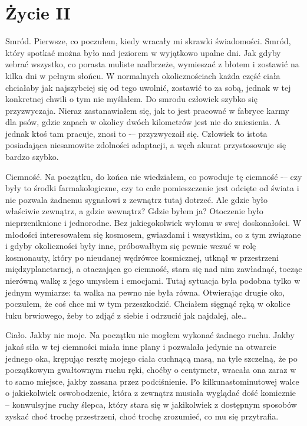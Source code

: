 \chapter{Życie II}

Smród. Pierwsze, co poczułem, kiedy wracały mi skrawki świadomości. Smród, który spotkać można było nad jeziorem w wyjątkowo upalne dni. Jak gdyby zebrać wszystko, co porasta muliste nadbrzeże, wymieszać z błotem i zostawić na kilka dni w pełnym słońcu. W normalnych okolicznościach każda część ciała chciałaby jak najszybciej się od tego uwolnić, zostawić to za sobą, jednak w tej konkretnej chwili o tym nie myślałem. Do smrodu człowiek szybko się przyzwyczaja. Nieraz zastanawiałem się, jak to jest pracować w fabryce karmy dla psów, gdzie zapach w okolicy dwóch kilometrów jest nie do zniesienia. A jednak ktoś tam pracuje, znosi to -– przyzwyczaił się. Człowiek to istota posiadająca niesamowite zdolności adaptacji, a węch akurat przystosowuje się bardzo szybko. 

Ciemność. Na początku, do końca nie wiedziałem, co powoduje tę ciemność -– czy były to środki farmakologiczne, czy to całe pomieszczenie jest odcięte od świata i nie pozwala żadnemu sygnałowi z zewnątrz tutaj dotrzeć. Ale gdzie było właściwie zewnątrz, a gdzie wewnątrz? Gdzie byłem ja? Otoczenie było nieprzeniknione i jednorodne. Bez jakiegokolwiek wyłomu w swej doskonałości. W młodości interesowałem się kosmosem, gwiazdami i wszystkim, co z tym związane i gdyby okoliczności były inne, próbowałbym się pewnie wczuć w rolę kosmonauty, który po nieudanej wędrówce kosmicznej, utknął w przestrzeni międzyplanetarnej, a otaczająca go ciemność, stara się nad nim zawładnąć, tocząc nierówną walkę z jego umysłem i emocjami. Tutaj sytuacja była podobna tylko w jednym wymiarze: ta walka na pewno nie była równa. Otwierając drugie oko, poczułem, że coś chce mi w tym przeszkodzić. Chciałem sięgnąć ręką w okolice łuku brwiowego, żeby to zdjąć z siebie i odrzucić jak najdalej, ale… 

Ciało. Jakby nie moje. Na początku nie mogłem wykonać żadnego ruchu. Jakby jakaś siła w tej ciemności miała inne plany i pozwalała jedynie na otwarcie jednego oka, krępując resztę mojego ciała cuchnącą masą, na tyle szczelną, że po początkowym gwałtownym ruchu ręki, choćby o centymetr, wracała ona zaraz w to samo miejsce, jakby zassana przez podciśnienie. Po kilkunastominutowej walce o jakiekolwiek oswobodzenie, która z zewnątrz musiała wyglądać dość komicznie -- konwulsyjne ruchy ślepca, który stara się w jakikolwiek z dostępnym sposobów zyskać choć trochę przestrzeni, choć trochę zrozumieć, co mu się przytrafia. 

